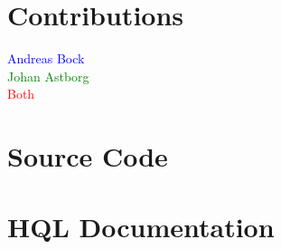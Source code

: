 \chapter{Contributions}


\newcommand{\treeroot}[1]{%
\node[above] at (0,0) {#1};%
\setcounter{treeline}{0}
}

\newcommand{\treeentry}[2]{%
\draw[->] (#2-1,-\value{treeline}/2) -- (#2-1,-\value{treeline}/2-0.5) -- (#2+0.5,-\value{treeline}/2-0.5) node[right] {#1};
\stepcounter{treeline}
}

\newcommand{\altentry}[2]{%
\draw[->] (#2-1,-\value{treeline}/2) -- (#2-1,-\value{treeline}/2-0.5) -- (#2+0.5,-\value{treeline}/2-0.5) node[right] {#1};
\foreach \x in {1,...,#2}
{   \draw (\x-1,-\value{treeline}/2) -- (\x-1,-\value{treeline}/2-0.5);
}
\stepcounter{treeline}
}

\textcolor{blue}{Andreas Bock}\\
\textcolor{green}{Johan Astborg}\\
\textcolor{red}{Both}\\


\chapter{Source Code}












\chapter{\textsc{HQL} Documentation}

